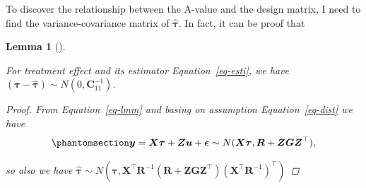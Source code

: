 \documentclass[
  a4paper,
  oneside,
  openany,
  12pt,
  onecolumn]{book}
\theoremstyle{definition}
\theoremstyle{definition}
\theoremstyle{plain}
\newtheorem{lemma}{Lemma}[chapter]
\theoremstyle{remark}
\begin{document}
To discover the relationship between the A-value and the design matrix,
I need to find the variance-covariance matrix of
\(\hat{\boldsymbol{\tau}}\). In fact, it can be proof that

\begin{lemma}[]\protect\hypertarget{lem-cov}{}\label{lem-cov}

For treatment effect and its estimator Equation~\ref{eq-esti}, we have
\((\boldsymbol{\tau}-\hat{\boldsymbol{\tau}})\sim N(0,\boldsymbol{C}_{11}^{-1})\).

\begin{proof}
From Equation~\ref{eq-lmm} and basing on assumption
Equation~\ref{eq-dist} we have
\begin{equation}\phantomsection\label{eq-asp}{
\boldsymbol{y}=\boldsymbol{X}\boldsymbol{\tau}+\boldsymbol{Z}\boldsymbol{u}+\boldsymbol{\epsilon}\sim N(\boldsymbol{X}\boldsymbol{\tau},\boldsymbol{R}+\boldsymbol{ZGZ}^\top),
}\end{equation}

so also we have
\(\hat{\boldsymbol{\tau}}\sim N(\boldsymbol{\tau},\boldsymbol{X}^\top\boldsymbol{R}^{-1}(\boldsymbol{R}+\boldsymbol{ZGZ}^\top)(\boldsymbol{X}^\top\boldsymbol{R}^{-1})^\top)\)


\end{proof}
\end{lemma}
\end{document}

